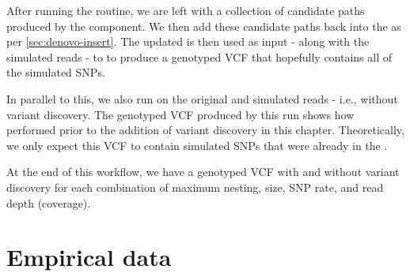 After running the  routine, we are left with a collection of candidate paths produced by the \denovo{} component. We then add these candidate paths back into the \panrg{} as per \autoref{sec:denovo-insert}. The updated \panrg{} is then used as input - along with the simulated reads - to \pandora{}  to produce a genotyped VCF that hopefully contains all of the simulated SNPs.

In parallel to this, we also run \pandora{}  on the original \panrg{} and simulated reads - i.e., without variant discovery. The genotyped VCF produced by this run shows how \pandora{} performed prior to the addition of \denovo{} variant discovery in this chapter. Theoretically, we only expect this VCF to contain simulated SNPs that were already in the \panrg{}.

At the end of this workflow, we have a genotyped VCF with and without \denovo{} variant discovery for each combination of maximum nesting, \denovo{} \kmer{} size, SNP rate, and read depth (coverage).





\section{Empirical data}

